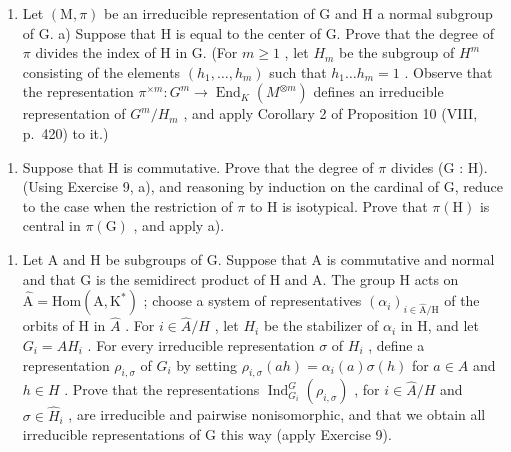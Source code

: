 \begin{enumerate}
\def\labelenumi{\arabic{enumi})}
\setcounter{enumi}{9}
\tightlist
\item
  Let \((\mathrm{M},\pi)\) be an irreducible representation of G and H a normal subgroup of G. a) Suppose that H is equal to the center of G. Prove that the degree of \(\pi\) divides the index of H in G. (For \(m \geqslant 1\) , let \(H_{m}\) be the subgroup of \(H^{m}\) consisting of the elements \((h_{1},\ldots,h_{m})\) such that \(h_{1}\ldots h_{m}=1\) . Observe that the representation \(\pi^{\times m}:G^{m}\to\operatorname{End}_{K}(M^{\otimes m})\) defines an irreducible representation of \(G^{m}/H_{m}\) , and apply Corollary 2 of Proposition 10 (VIII, p.~420) to it.)
\end{enumerate}

\begin{enumerate}
\def\labelenumi{\alph{enumi})}
\setcounter{enumi}{1}
\tightlist
\item
  Suppose that H is commutative. Prove that the degree of \(\pi\) divides (G : H). (Using Exercise 9, a), and reasoning by induction on the cardinal of G, reduce to the case when the restriction of \(\pi\) to H is isotypical. Prove that \(\pi(\mathrm{H})\) is central in \(\pi(\mathrm{G})\) , and apply a).
\end{enumerate}

\begin{enumerate}
\def\labelenumi{\arabic{enumi})}
\setcounter{enumi}{10}
\tightlist
\item
  Let A and H be subgroups of G. Suppose that A is commutative and normal and that G is the semidirect product of H and A. The group H acts on \(\widehat{\mathrm{A}} = \mathrm{Hom}(\mathrm{A}, \mathrm{K}^{*})\) ; choose a system of representatives \((\alpha_{i})_{i \in \widehat{\mathrm{A}}/\mathrm{H}}\) of the orbits of H in \(\widehat{A}\) . For \(i \in \widehat{A}/H\) , let \(H_{i}\) be the stabilizer of \(\alpha_{i}\) in H, and let \(G_{i} = AH_{i}\) . For every irreducible representation \(\sigma\) of \(H_{i}\) , define a representation \(\rho_{i,\sigma}\) of \(G_{i}\) by setting \(\rho_{i,\sigma}(ah) = \alpha_{i}(a)\sigma(h)\) for \(a \in A\) and \(h \in H\) . Prove that the representations \(\operatorname{Ind}_{G_{i}}^{G}(\rho_{i,\sigma})\) , for \(i \in \widehat{A}/H\) and \(\sigma \in \widehat{H}_{i}\) , are irreducible and pairwise nonisomorphic, and that we obtain all irreducible representations of G this way (apply Exercise 9).
\end{enumerate}

